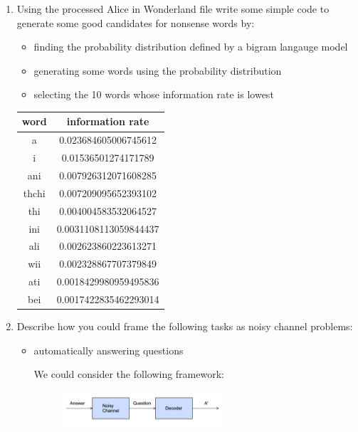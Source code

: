 \documentclass[10pt,\jkfside,a4paper]{article}
\begin{document}
\begin{enumerate}
\item Using the processed Alice in Wonderland file write some simple code to
generate some good candidates for nonsense words by:

\begin{itemize}[label = -]

\item finding the probability distribution defined by a bigram langauge model

\item generating some words using the probability distribution

\item selecting the 10 words whose information rate is lowest

\end{itemize}

\begin{table}[H]
\centering
\begin{tabular}{c|c}
word & information rate \\
\hline
a & 0.023684605006745612 \\
i & 0.01536501274171789 \\
ani & 0.007926312071608285 \\
thchi & 0.007209095652393102 \\
thi & 0.004004583532064527 \\
ini & 0.0031108113059844437 \\
ali & 0.002623860223613271 \\
wii & 0.002328867707379849 \\
ati & 0.0018429980959495836 \\
bei & 0.0017422835462293014
\end{tabular}
\end{table}


\item Describe how you could frame the following tasks as noisy channel
problems:

\begin{itemize}[label = -]

\item automatically answering questions

We could consider the following framework:

\begin{figure}[H]
\centering
\includegraphics[width=0.6\textwidth]{noisychannel}
\end{figure}


\end{itemize}
\end{enumerate}
\end{document}
